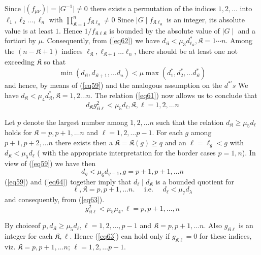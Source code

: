 Since $ \mid ( f_{\mu \nu} )\mid = \mid G^{-1} \mid  \neq 0 $ there
exists a permutation of the indices $ 1,2, \ldots $ into $ \ell_1,
\ell_2 \ldots , \ell_n $ with $\prod\limits^n_{\mathfrak{K}=1}
f_{\mathfrak{K} \ell_\mathfrak{K}} \neq 0 $ Since $ \mid G \mid f_{\mathfrak{K}
  \ell_\mathfrak{K}} $ is an integer, its absolute value is at least
$1$. Hence $ 1/ f_{\mathfrak{K} \ell \mathfrak{K}} $ is bounded by the
absolute value of $ \mid G \mid $ and a fortiori by  $ \mu
$. Consequently, from (\ref{eq62}) we have $ d_\mathfrak{K} <  \mu_3
d^*_{\ell_\mathfrak{K}}, \mathfrak{K} = 1 \cdots n $. Among the $ (
n-\mathfrak{K} + 1 )$ indices $ \ell_\mathfrak{K}, \ell_{\mathfrak{K}+1 }
\ldots \ell_n $, there should be at least one not exceeding $
\mathfrak{K} $ so that  
$$
\min ( d_\mathfrak{K}, d_{\mathfrak{K}+1}, \ldots d_n ) < \mu \max (
d^*_1, d^*_2, \ldots d^*_\mathfrak{K} ) 
$$
and hence, by means of (\ref{eq59}) and the analogous assumption on the  $
d^{*'}s $  We have $ d_\mathfrak{K} < \mu_4 d^*_\mathfrak{K},
\mathfrak{K} =1,2 \ldots n $. The relation (\ref{eq61}) now allows us to
conclude that  
\begin{equation*}
d_\mathfrak{K} g^2_{\mathfrak{K} \ell} < \mu_5 d_\ell, \mathfrak{K}, \ell
= 1,2, \ldots n \tag{63}\label{eq63}   
\end{equation*}

Let $p$ denote the largest number among $ 1,2, \ldots n $
such that the relation $ d_\mathfrak{K} \ge \mu_5 d_\ell $ holds for $
\mathfrak{K} = p, p + 1, \ldots n $ and  $ \ell =
1,2, \ldots p-1 $. For each $g$ among  $ p + 1,
p+ 2, \ldots n $ there exists  then a  $ \mathfrak{K} =
\mathfrak{K} ( g) \ge q $  and an  $ \ell = \ell_g < g $ with $
d_\mathfrak{K} < \mu_5 d_\ell $ ( with the appropriate interpretation
for the  border cases $p = 1, n$).  In view of (\ref{eq59}) we have then 
\begin{equation*} 
d_g < \mu_6 d_{g-1}, g = p + 1, p + 1,\ldots n\tag{64}\label{eq64}   
\end{equation*}
(\ref{eq59}) and (\ref{eq64}) together imply that $ d_\ell \mid d_\mathfrak{K} $
is a bounded quotient for  
$$
\ell, \mathfrak{K} = p, p+1, \ldots n. \quad \text{ i.e. } \quad 
d_\ell < \mu_7 d_\lambda 
$$
and consequently, from (\ref{eq63}).
$$
g^2_{\mathfrak{K} \ell} < \mu_5 \mu_4, \ell = p, p+1, \ldots, n
$$

By choice\pageoriginale of  $p,d_\mathfrak{K} \ge  \mu_5 d_\ell , \ell =
1,2, \ldots, p-1 $  and  $ \mathfrak{K} = p,
p+1, \ldots n $. Also $ g_{\mathfrak{K} \ell} $  is an
integer for each $ \mathfrak{K}, \ell $. Hence (\ref{eq63}) can hold only
if  $ g_{\mathfrak{K} \ell} = 0 $ for these indices, viz. $ \mathfrak{K}
=p,p + 1, \ldots n $; $ \ell = 1,2, \ldots p-1 $. 

